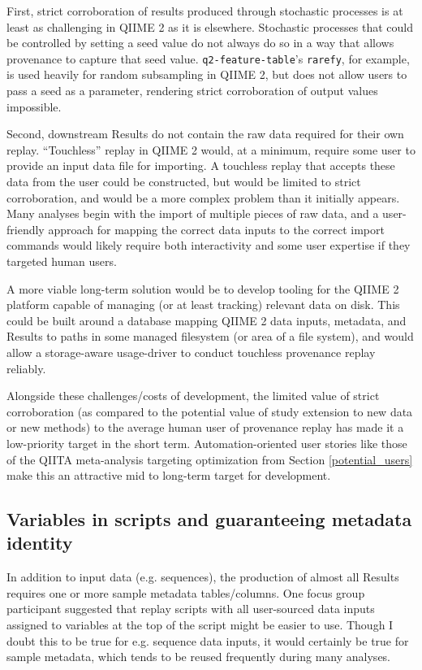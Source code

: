 First, strict corroboration of results produced through stochastic processes is
at least as challenging in QIIME 2 as it is elsewhere. Stochastic processes that
could be controlled by setting a seed value do not always do so in a way that
allows provenance to capture that seed value. \texttt{q2-feature-table}’s \texttt{rarefy},
for example, is used heavily for random subsampling in QIIME 2, but does not allow
users to pass a seed as a parameter, rendering strict corroboration of output
values impossible.

Second, downstream Results do not contain the raw data required for their own
replay. “Touchless” replay in QIIME 2 would, at a minimum, require some user to
provide an input data file for importing. A touchless replay that accepts these
data from the user could be constructed, but would be limited to strict
corroboration, and would be a more complex problem than it initially appears.
Many analyses begin with the import of multiple pieces of raw data, and a
user-friendly approach for mapping the correct data inputs to the correct import
commands would likely require both interactivity and some user expertise if they
targeted human users.

A more viable long-term solution would be to develop tooling for the QIIME 2
platform capable of managing (or at least tracking) relevant data on disk. This
could be built around a database mapping QIIME 2 data inputs, metadata, and
Results to paths in some managed filesystem (or area of a file system), and
would allow a storage-aware usage-driver to conduct touchless provenance replay
reliably.

Alongside these challenges/costs of development, the limited value of strict
corroboration (as compared to the potential value of study extension to new data
or new methods) to the average human user of provenance replay has made it a
low-priority target in the short term. Automation-oriented user stories like
those of the QIITA meta-analysis targeting optimization from Section \ref{potential_users}
make this an attractive mid to long-term target for development.

\subsection{Variables in scripts and guaranteeing metadata identity \parencite[Issue 44]{keefe_issues_2021}}

In addition to input data (e.g. sequences), the production of almost all Results
requires one or more sample metadata tables/columns. One focus group participant
suggested that replay scripts with all user-sourced data inputs assigned to
variables at the top of the script might be easier to use. Though I doubt this
to be true for e.g. sequence data inputs, it would certainly be true for sample
metadata, which tends to be reused frequently during many analyses.

